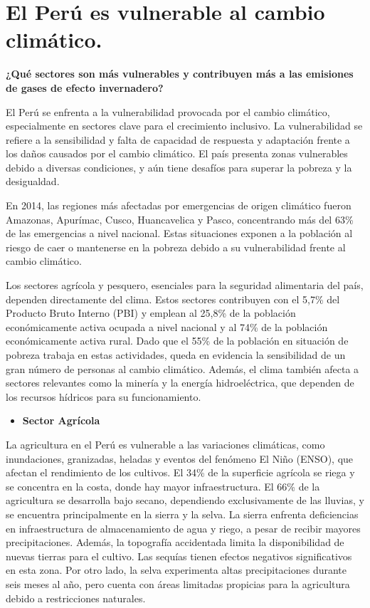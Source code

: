 \documentclass[
  a4paper,
]{article}
\providecommand{\tightlist}{%
  \setlength{\itemsep}{0pt}\setlength{\parskip}{0pt}}\usepackage{longtable,booktabs,array}
\begin{document}
\hypertarget{el-peruxfa-es-vulnerable-al-cambio-climuxe1tico.}{%
\section{El Perú es vulnerable al cambio
climático.}\label{el-peruxfa-es-vulnerable-al-cambio-climuxe1tico.}}

\textbf{¿Qué sectores son más vulnerables y contribuyen más a las
emisiones de gases de efecto invernadero?}

El Perú se enfrenta a la vulnerabilidad provocada por el cambio
climático, especialmente en sectores clave para el crecimiento
inclusivo. La vulnerabilidad se refiere a la sensibilidad y falta de
capacidad de respuesta y adaptación frente a los daños causados por el
cambio climático. El país presenta zonas vulnerables debido a diversas
condiciones, y aún tiene desafíos para superar la pobreza y la
desigualdad.

En 2014, las regiones más afectadas por emergencias de origen climático
fueron Amazonas, Apurímac, Cusco, Huancavelica y Pasco, concentrando más
del 63\% de las emergencias a nivel nacional. Estas situaciones exponen
a la población al riesgo de caer o mantenerse en la pobreza debido a su
vulnerabilidad frente al cambio climático.

Los sectores agrícola y pesquero, esenciales para la seguridad
alimentaria del país, dependen directamente del clima. Estos sectores
contribuyen con el 5,7\% del Producto Bruto Interno (PBI) y emplean al
25,8\% de la población económicamente activa ocupada a nivel nacional y
al 74\% de la población económicamente activa rural. Dado que el 55\% de
la población en situación de pobreza trabaja en estas actividades, queda
en evidencia la sensibilidad de un gran número de personas al cambio
climático. Además, el clima también afecta a sectores relevantes como la
minería y la energía hidroeléctrica, que dependen de los recursos
hídricos para su funcionamiento.

\begin{itemize}
\tightlist
\item
  \textbf{Sector Agrícola}
\end{itemize}

La agricultura en el Perú es vulnerable a las variaciones climáticas,
como inundaciones, granizadas, heladas y eventos del fenómeno El Niño
(ENSO), que afectan el rendimiento de los cultivos. El 34\% de la
superficie agrícola se riega y se concentra en la costa, donde hay mayor
infraestructura. El 66\% de la agricultura se desarrolla bajo secano,
dependiendo exclusivamente de las lluvias, y se encuentra principalmente
en la sierra y la selva. La sierra enfrenta deficiencias en
infraestructura de almacenamiento de agua y riego, a pesar de recibir
mayores precipitaciones. Además, la topografía accidentada limita la
disponibilidad de nuevas tierras para el cultivo. Las sequías tienen
efectos negativos significativos en esta zona. Por otro lado, la selva
experimenta altas precipitaciones durante seis meses al año, pero cuenta
con áreas limitadas propicias para la agricultura debido a restricciones
naturales.
\end{document}
